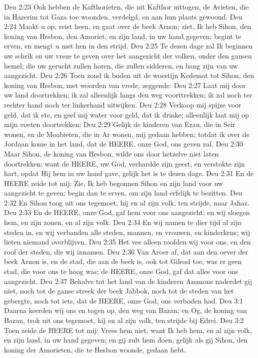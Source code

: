 Deu 2:23  Ook hebben de Kafthorieten, die uit Kafthor uittogen, de Avieten, die in Hazerim tot Gaza toe woonden, verdelgd, en aan hun plaats gewoond.
Deu 2:24  Maakt u op, reist heen, en gaat over de beek Arnon; ziet, Ik heb Sihon, den koning van Hesbon, den Amoriet, en zijn land, in uw hand gegeven; begint te erven, en mengt u met hen in den strijd.
Deu 2:25  Te dezen dage zal Ik beginnen uw schrik en uw vreze te geven over het aangezicht der volken, onder den gansen hemel; die uw gerucht zullen horen, die zullen sidderen, en bang zijn van uw aangezicht.
Deu 2:26  Toen zond ik boden uit de woestijn Kedemot tot Sihon, den koning van Hesbon, met woorden van vrede, zeggende:
Deu 2:27  Laat mij door uw land doortrekken; ik zal alleenlijk langs den weg voorttrekken; ik zal noch ter rechter hand noch ter linkerhand uitwijken.
Deu 2:28  Verkoop mij spijze voor geld, dat ik ete, en geef mij water voor geld, dat ik drinke; alleenlijk laat mij op mijn voeten doortrekken;
Deu 2:29  Gelijk de kinderen van Ezau, die in Seir wonen, en de Moabieten, die in Ar wonen, mij gedaan hebben; totdat ik over de Jordaan kome in het land, dat de HEERE, onze God, ons geven zal.
Deu 2:30  Maar Sihon, de koning van Hesbon, wilde ons door hetzelve niet laten doortrekken; want de HEERE, uw God, verhardde zijn geest, en verstokte zijn hart, opdat Hij hem in uw hand gave, gelijk het is te dezen dage.
Deu 2:31  En de HEERE zeide tot mij: Zie, Ik heb begonnen Sihon en zijn land voor uw aangezicht te geven; begin dan te erven, om zijn land erfelijk te bezitten.
Deu 2:32  En Sihon toog uit ons tegemoet, hij en al zijn volk, ten strijde, naar Jahaz.
Deu 2:33  En de HEERE, onze God, gaf hem voor ons aangezicht; en wij sloegen hem, en zijn zonen, en al zijn volk.
Deu 2:34  En wij namen te dier tijd al zijn steden in, en wij verbanden alle steden, mannen, en vrouwen, en kinderkens; wij lieten niemand overblijven.
Deu 2:35  Het vee alleen roofden wij voor ons, en den roof der steden, die wij innamen.
Deu 2:36  Van Aroer af, dat aan den oever der beek Arnon is, en de stad, die aan de beek is, ook tot Gilead toe, was er geen stad, die voor ons te hoog was; de HEERE, onze God, gaf dat alles voor ons aangezicht.
Deu 2:37  Behalve tot het land van de kinderen Ammons naderdet gij niet, noch tot de ganse streek der beek Jabbok, noch tot de steden van het gebergte, noch tot iets, dat de HEERE, onze God, ons verboden had.
Deu 3:1  Daarna keerden wij ons en togen op, den weg van Bazan; en Og, de koning van Bazan, trok uit ons tegemoet, hij en al zijn volk, ten strijde bij Edrei.
Deu 3:2  Toen zeide de HEERE tot mij: Vrees hem niet, want Ik heb hem, en al zijn volk, en zijn land, in uw hand gegeven; en gij zult hem doen, gelijk als gij Sihon, den koning der Amorieten, die te Hesbon woonde, gedaan hebt.
